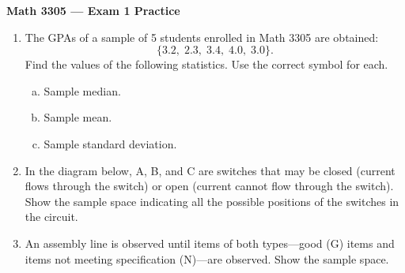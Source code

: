 \documentclass[12pt]{article}
\begin{document}
\begin{center}
  \textbf{\large Math 3305 --- Exam 1 Practice}
\end{center}

\bigskip

\begin{enumerate}
  \item The GPAs of a sample of 5 students enrolled in Math 3305 are obtained:
    \[
      \{3.2,\; 2.3,\; 3.4,\; 4.0,\; 3.0\}.
    \]
    Find the values of the following statistics. Use the correct symbol for each.
    \begin{enumerate}[(a)]
      \item Sample median.
      \item Sample mean.
      \item Sample standard deviation.
    \end{enumerate}

  \setcounter{enumi}{3}
  \item In the diagram below, A, B, and C are switches that may be closed (current flows through the switch) or open (current cannot flow through the switch). Show the sample space indicating all the possible positions of the switches in the circuit.

    \begin{center}
    \end{center}

\newpage

  \setcounter{enumi}{9}
  \item An assembly line is observed until items of both types---good (G) items and items not meeting specification (N)---are observed. Show the sample space.


\end{enumerate}
\end{document}
